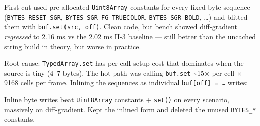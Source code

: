 First cut used pre-allocated \texttt{U\allowbreak{}i\allowbreak{}n\allowbreak{}t\allowbreak{}8\allowbreak{}A\allowbreak{}r\allowbreak{}r\allowbreak{}a\allowbreak{}y} constants for every fixed byte sequence (\texttt{B\allowbreak{}Y\allowbreak{}T\allowbreak{}E\allowbreak{}S\allowbreak{}\_\allowbreak{}R\allowbreak{}E\allowbreak{}S\allowbreak{}E\allowbreak{}T\allowbreak{}\_\allowbreak{}S\allowbreak{}G\allowbreak{}R}, \texttt{B\allowbreak{}Y\allowbreak{}T\allowbreak{}E\allowbreak{}S\allowbreak{}\_\allowbreak{}S\allowbreak{}G\allowbreak{}R\allowbreak{}\_\allowbreak{}F\allowbreak{}G\allowbreak{}\_\allowbreak{}T\allowbreak{}R\allowbreak{}U\allowbreak{}E\allowbreak{}C\allowbreak{}O\allowbreak{}L\allowbreak{}O\allowbreak{}R}, \texttt{B\allowbreak{}Y\allowbreak{}T\allowbreak{}E\allowbreak{}S\allowbreak{}\_\allowbreak{}S\allowbreak{}G\allowbreak{}R\allowbreak{}\_\allowbreak{}B\allowbreak{}O\allowbreak{}L\allowbreak{}D}, \ldots) and blitted them with \texttt{b\allowbreak{}u\allowbreak{}f\allowbreak{}.\allowbreak{}s\allowbreak{}e\allowbreak{}t\allowbreak{}(\allowbreak{}s\allowbreak{}r\allowbreak{}c\allowbreak{},\allowbreak{} \allowbreak{}o\allowbreak{}f\allowbreak{}f\allowbreak{})}. Clean code, but bench showed diff-gradient \emph{regressed} to 2.16 ms vs the 2.02 ms II-3 baseline --- still better than the uncached string build in theory, but worse in practice.

Root cause: \texttt{T\allowbreak{}y\allowbreak{}p\allowbreak{}e\allowbreak{}d\allowbreak{}A\allowbreak{}r\allowbreak{}r\allowbreak{}a\allowbreak{}y\allowbreak{}.\allowbreak{}s\allowbreak{}e\allowbreak{}t} has per-call setup cost that dominates when the source is tiny (4--7 bytes). The hot path was calling \texttt{b\allowbreak{}u\allowbreak{}f\allowbreak{}.\allowbreak{}s\allowbreak{}e\allowbreak{}t} \textasciitilde15× per cell × 9168 cells per frame. Inlining the sequences as individual \texttt{b\allowbreak{}u\allowbreak{}f\allowbreak{}[\allowbreak{}o\allowbreak{}f\allowbreak{}f\allowbreak{}]\allowbreak{} \allowbreak{}=\allowbreak{} \allowbreak{}…} writes:



Inline byte writes beat \texttt{U\allowbreak{}i\allowbreak{}n\allowbreak{}t\allowbreak{}8\allowbreak{}A\allowbreak{}r\allowbreak{}r\allowbreak{}a\allowbreak{}y} constants + \texttt{s\allowbreak{}e\allowbreak{}t\allowbreak{}(\allowbreak{})} on every scenario, massively on diff-gradient. Kept the inlined form and deleted the unused \texttt{B\allowbreak{}Y\allowbreak{}T\allowbreak{}E\allowbreak{}S\allowbreak{}\_\allowbreak{}*} constants.

